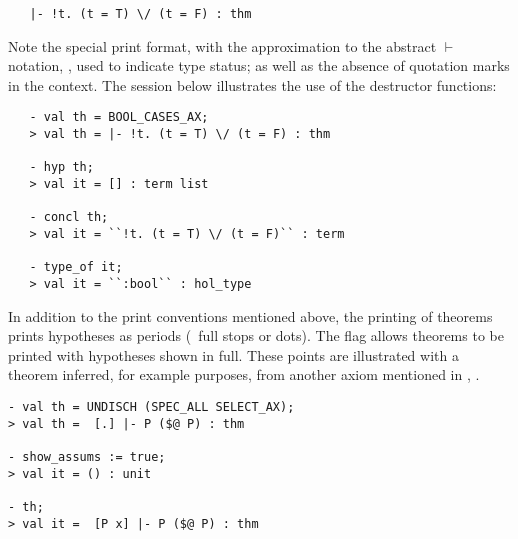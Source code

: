 \begin{hol}
\begin{verbatim}
   |- !t. (t = T) \/ (t = F) : thm
\end{verbatim}
\end{hol}

\noindent
Note the special print format,
%
with the approximation
to the abstract $\vdash$ notation,
%
%
\ml{|-}, used to indicate \ML{} type  status; as well as the
absence of \HOL{} quotation marks
%
%
in the \ml{|-} context.  The session below illustrates the use of the
destructor functions:

\setcounter{sessioncount}{0}
\begin{session}
\begin{verbatim}
   - val th = BOOL_CASES_AX;
   > val th = |- !t. (t = T) \/ (t = F) : thm

   - hyp th;
   > val it = [] : term list

   - concl th;
   > val it = ``!t. (t = T) \/ (t = F)`` : term

   - type_of it;
   > val it = ``:bool`` : hol_type
\end{verbatim}
\end{session}

\noindent In addition to the print conventions mentioned above, the
printing of theorems prints hypotheses
as periods (\ie\ full stops or dots).  The flag 
 allows theorems
to be printed with hypotheses shown in full. These points are illustrated with a
theorem inferred, for example purposes, from another axiom mentioned
in \LOGIC, .

\begin{session}
\begin{verbatim}
- val th = UNDISCH (SPEC_ALL SELECT_AX);
> val th =  [.] |- P ($@ P) : thm

- show_assums := true;
> val it = () : unit

- th;
> val it =  [P x] |- P ($@ P) : thm
\end{verbatim}
\end{session}

